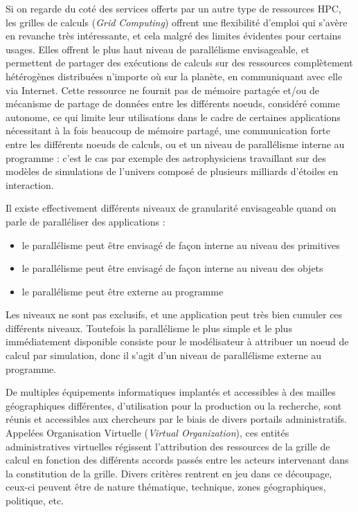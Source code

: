Si on regarde du coté des services offerts par un autre type de ressources HPC, les grilles de calculs (\textit{Grid Computing}) offrent une flexibilité d'emploi qui s'avère en revanche très intéressante, et cela malgré des limites évidentes pour certains usages.
Elles offrent le plus haut niveau de parallélisme envisageable, et permettent de partager des exécutions de calculs sur des ressources complètement hétérogènes distribuées n'importe où sur la planète, en communiquant avec elle via Internet. Cette ressource ne fournit pas de mémoire partagée et/ou de mécanisme de partage de données entre les différents noeuds, considéré comme autonome, ce qui limite leur utilisations dans le cadre de certaines applications nécessitant à la fois beaucoup de mémoire partagé, une communication forte entre les différents noeuds de calculs, ou et un niveau de parallélisme interne au programme : c'est le cas par exemple des astrophysiciens travaillant sur des modèles de simulations de l'univers composé de plusieurs milliards d'étoiles en interaction.

Il existe effectivement différents niveaux de granularité envisageable quand on parle de paralléliser des applications :
\begin{itemize}[label=\textbullet]
\item le parallélisme peut être envisagé de façon interne au niveau des primitives
\item le parallélisme peut être envisagé de façon interne au niveau des objets
\item le parallélisme peut être externe au programme
\end{itemize}

Les niveaux ne sont pas exclusifs, et une application peut très bien cumuler ces différents niveaux. Toutefois la parallélisme le plus simple et le plus immédiatement disponible consiste pour le modélisateur à attribuer un noeud de calcul par simulation, donc il s'agit d'un niveau de parallélisme externe au programme.

De multiples équipements informatiques implantés et accessibles à des mailles géographiques différentes, d'utilisation pour la production ou la recherche, sont réunis et accessibles aux chercheurs par le biais de divers portails administratifs. Appelées Organisation Virtuelle (\textit{Virtual Organization}), ces entités administratives virtuelles régissent l'attribution des ressources de la grille de calcul en fonction des différents accords passés entre les acteurs intervenant dans la constitution de la grille. Divers critères rentrent en jeu dans ce découpage, ceux-ci peuvent être de nature thématique, technique, zones géographiques, politique, etc.

